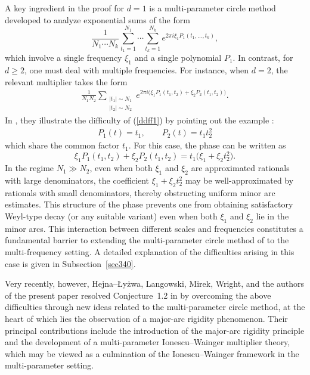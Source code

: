 \documentclass[11 pt,letterpaper]{amsart}
\theoremstyle{plain}
\theoremstyle{definition}
\theoremstyle{remark} \theoremstyle{exam} \theoremstyle{ob}
\numberwithin{equation}{section}
\begin{document}
A key ingredient in the proof for $d=1$ is a multi-parameter circle method developed to analyze exponential sums of the form
\[
	\frac{1}{N_1\cdots N_k}
\sum_{t_1=1}^{N_1}\cdots\sum_{t_k=1}^{N_k}
e^{2\pi i \xi_1 P_1(t_1,\dots,t_k)},
\]
which involve a single frequency $\xi_1$ and a single polynomial $P_1$.
In contrast, for $d\ge 2$, one must deal with multiple frequencies. For instance, when $d=2$, the relevant multiplier takes the form
\begin{align}\label{ddff1}
	\frac{1}{N_1 N_2}
	\sum_{\substack{|t_1|\sim N_1\\ |t_2|\sim N_2}}
	e^{2\pi i\bigl(\xi_1 P_1(t_1,t_2)+\xi_2 P_2(t_1,t_2)\bigr)}.
\end{align}
In \cite{B4},  they  illustrate the difficulty of (\ref{ddff1}) by  pointing out the example :
\begin{align}\label{tt}
P_1(t)=t_1,\qquad P_2(t)=t_1 t_2^2	
\end{align}
which share the common factor $t_1$.
For this case, the phase can be written as
\[
\xi_1 P_1(t_1,t_2)+\xi_2 P_2(t_1,t_2)
= t_1\bigl(\xi_1 + \xi_2 t_2^2\bigr).
\]
In the regime $N_1\gg N_2$, even when  both $\xi_1$ and $\xi_2$ are approximated rationals with large denominators, the coefficient $\xi_1+\xi_2 t_2^2$ may be well-approximated by rationals with small denominators, thereby obstructing uniform minor arc estimates. This structure of the phase prevents one from obtaining satisfactory Weyl-type decay (or any suitable variant) even when both $\xi_1$ and $\xi_2$ lie in the minor arcs.  This interaction between different scales and frequencies constitutes a fundamental barrier to extending the multi-parameter circle method of  \cite{B4} to the multi-frequency setting. A detailed explanation of the difficulties arising in this case is given in Subsection~\ref{sec340}.



Very recently, however, Hejna--Łyżwa, Langowski, Mirek, Wright, and the authors of the present paper resolved Conjecture~1.2 in \cite{HKLMSW} by overcoming the above difficulties through new ideas related to the multi-parameter circle method, at the heart of which lies the observation of a major-arc rigidity phenomenon. Their principal contributions include the introduction of the
major-arc rigidity principle and the development of a multi-parameter
Ionescu--Wainger multiplier theory, which may be viewed as a culmination of
the Ionescu--Wainger framework in the multi-parameter setting.
\end{document}
